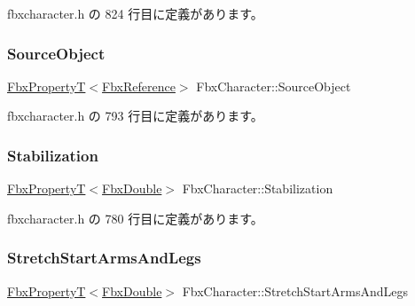  fbxcharacter.\+h の 824 行目に定義があります。

\mbox{\label{class_fbx_character_ac795fa45cdd1130e47667fa534510050}} 
\subsubsection{\texorpdfstring{Source\+Object}{SourceObject}}
{\footnotesize\ttfamily \hyperlink{class_fbx_property_t}{Fbx\+PropertyT}$<$\hyperlink{fbxtypes_8h_a44df6a2eec915cf27cd481e5c5e48a24}{Fbx\+Reference}$>$ Fbx\+Character\+::\+Source\+Object}



 fbxcharacter.\+h の 793 行目に定義があります。

\mbox{\label{class_fbx_character_a52d730a256495edf5b99b323f40cfcfe}} 
\subsubsection{\texorpdfstring{Stabilization}{Stabilization}}
{\footnotesize\ttfamily \hyperlink{class_fbx_property_t}{Fbx\+PropertyT}$<$\hyperlink{fbxtypes_8h_a171e72a1c46fc15c1a6c9c31948c1c5b}{Fbx\+Double}$>$ Fbx\+Character\+::\+Stabilization}



 fbxcharacter.\+h の 780 行目に定義があります。

\mbox{\label{class_fbx_character_a988aa7c18fa2e1f1f0fbd9f7a75da84d}} 
\subsubsection{\texorpdfstring{Stretch\+Start\+Arms\+And\+Legs}{StretchStartArmsAndLegs}}
{\footnotesize\ttfamily \hyperlink{class_fbx_property_t}{Fbx\+PropertyT}$<$\hyperlink{fbxtypes_8h_a171e72a1c46fc15c1a6c9c31948c1c5b}{Fbx\+Double}$>$ Fbx\+Character\+::\+Stretch\+Start\+Arms\+And\+Legs}



